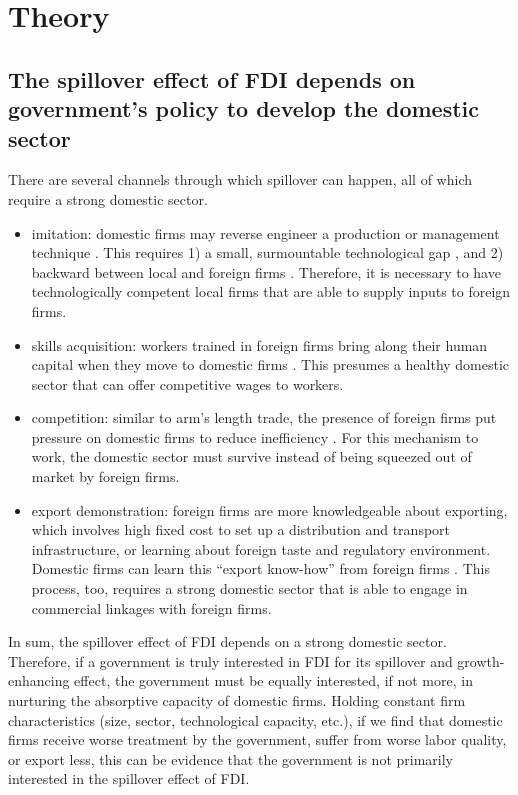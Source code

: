 \documentclass[12pt]{article}
\begin{document}
\section{Theory}

\subsection{The spillover effect of FDI depends on government's policy to develop the domestic sector}

There are several channels through which spillover can happen, all of which require a strong domestic sector.
\begin{itemize}
	\item imitation:  domestic firms may reverse engineer a production or management technique \citep{Wang1992}. This requires 1) a small, surmountable technological gap \citep{Kokko1996}, and 2) backward between local and foreign firms \citep{Javorcik2004}. Therefore, it is necessary to have technologically competent local firms that are able to supply inputs to foreign firms.
	\item skills acquisition: workers trained in foreign firms bring along their human capital when they move to domestic firms \citep{Djankov2000}. This presumes a healthy domestic sector that can offer competitive wages to workers. 
	\item competition: similar to arm's length trade, the presence of foreign firms put pressure on domestic firms to reduce inefficiency \citep{Glass2002}. For this mechanism to work, the domestic sector must survive instead of being squeezed out of market by foreign firms.
	\item export demonstration: foreign firms are more knowledgeable about exporting, which involves high fixed cost to set up a distribution and transport infrastructure, or learning about foreign taste and regulatory environment. Domestic firms can learn this ``export know-how'' from foreign firms \citep{Aitken1997}. This process, too, requires a strong domestic sector that is able to engage in commercial linkages with foreign firms.
\end{itemize}

In sum, the spillover effect of FDI depends on a strong domestic sector. Therefore, if a government is truly interested in FDI for its spillover and growth-enhancing effect, the government must be equally interested, if not more, in nurturing the absorptive capacity of domestic firms. Holding constant firm characteristics (size, sector, technological capacity, etc.), if we find that domestic firms receive worse treatment by the government, suffer from worse labor quality, or export less, this can be evidence that the government is not primarily interested in the spillover effect of FDI.
\end{document}
